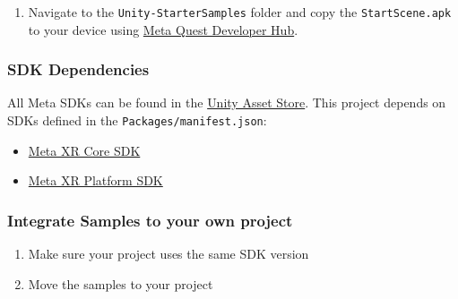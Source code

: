 \documentclass{article}
\begin{document}

    \begin{enumerate}
    \item Navigate to the \texttt{Unity-StarterSamples} folder and copy the \texttt{StartScene.apk} to your device using \href{https://developer.oculus.com/documentation/unity/ts-odh-deploy-build/}{Meta Quest Developer Hub}.
\end{enumerate}

\subsubsection{SDK Dependencies}
All Meta SDKs can be found in the \href{https://assetstore.unity.com/publishers/25353}{Unity Asset Store}. This project depends on SDKs defined in the \texttt{Packages/manifest.json}:
\begin{itemize}
    \item \href{https://assetstore.unity.com/packages/tools/integration/meta-xr-core-sdk-269169}{Meta XR Core SDK}
    \item \href{https://assetstore.unity.com/packages/tools/integration/meta-xr-platform-sdk-262366}{Meta XR Platform SDK}
\end{itemize}

\subsubsection{Integrate Samples to your own project}
\begin{enumerate}
    \item Make sure your project uses the same SDK version
    \item Move the samples to your project
\end{enumerate}
\end{document}
